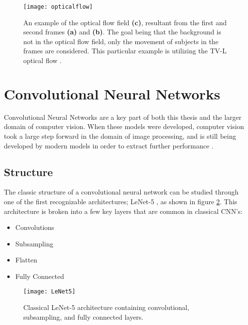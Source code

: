 \begin{figure}[ht]
	\texttt{[image: opticalflow]}
	\centering
	\caption{An example of the optical flow field \textbf{(c)}, resultant from the first and second frames \textbf{(a)} and \textbf{(b)}. The goal being that the background is not in the optical flow field, only the movement of subjects in the frames are considered. This particular example is utilizing the TV-L optical flow \cite{TV-L}.}
	\label{fig:opticalflow}
\end{figure}


\section{Convolutional Neural Networks}
\label{sec:CNNs}

Convolutional Neural Networks are a key part of both this thesis and the larger domain of computer vision. When these models were developed, computer vision took a large step forward in the domain of image processing, and is still being developed by modern models in order to extract further performance \cite{deeplearning}.

\subsection{Structure}

The classic structure of a convolutional neural network can be studied through one of the first recognizable architectures; LeNet-5 \cite{lenet5}, as shown in figure \ref{fig:lenet5}. This architecture is broken into a few key layers that are common in classical CNN's:

\begin{itemize}
	\item Convolutions
	\item Subsampling
	\item Flatten
	\item Fully Connected
\end{itemize}

\begin{figure}[ht]
	\texttt{[image: LeNet5]}
	\centering
	\caption{Classical LeNet-5 architecture \cite{lenet5} containing convolutional, subsampling, and fully connected layers.}
	\label{fig:lenet5}
\end{figure}

